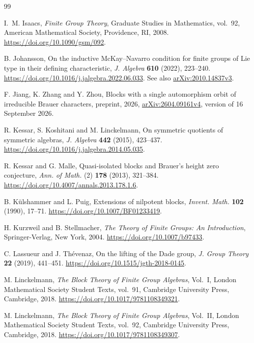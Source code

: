 \documentclass[11pt,a4paper]{article}
\theoremstyle{definition}
\theoremstyle{remark}
\numberwithin{equation}{section}
\begin{document}
\begin{thebibliography}{99}
		
		 I.~M. Isaacs, \textit{Finite Group Theory}, Graduate Studies in Mathematics, vol.~92, American Mathematical Society, Providence, RI, 2008. \url{https://doi.org/10.1090/gsm/092}.
		
		 B. Johansson, On the inductive McKay--Navarro condition for finite groups of Lie type in their defining characteristic, \textit{J. Algebra} \textbf{610} (2022), 223--240. \url{https://doi.org/10.1016/j.jalgebra.2022.06.033}. See also \href{https://arxiv.org/abs/2010.14837v3}{arXiv:2010.14837v3}.
		
		 F. Jiang, K. Zhang and Y. Zhou, Blocks with a single automorphism orbit of irreducible Brauer characters, preprint, 2026, \href{https://arxiv.org/abs/2604.09161v4}{arXiv:2604.09161v4}, version of 16 September 2026.
		
		 R. Kessar, S. Koshitani and M. Linckelmann, On symmetric quotients of symmetric algebras, \textit{J. Algebra} \textbf{442} (2015), 423--437. \url{https://doi.org/10.1016/j.jalgebra.2014.05.035}.
		
		 R. Kessar and G. Malle, Quasi-isolated blocks and Brauer's height zero conjecture, \textit{Ann. of Math.} (2) \textbf{178} (2013), 321--384. \url{https://doi.org/10.4007/annals.2013.178.1.6}.
		
		 B. K\"ulshammer and L. Puig, Extensions of nilpotent blocks, \textit{Invent. Math.} \textbf{102} (1990), 17--71. \url{https://doi.org/10.1007/BF01233419}.
		
		 H. Kurzweil and B. Stellmacher, \textit{The Theory of Finite Groups: An Introduction}, Springer-Verlag, New York, 2004. \url{https://doi.org/10.1007/b97433}.
		
		 C. Lassueur and J. Th\'evenaz, On the lifting of the Dade group, \textit{J. Group Theory} \textbf{22} (2019), 441--451. \url{https://doi.org/10.1515/jgth-2018-0145}.
		
		 M. Linckelmann, \textit{The Block Theory of Finite Group Algebras}, Vol.~I, London Mathematical Society Student Texts, vol.~91, Cambridge University Press, Cambridge, 2018. \url{https://doi.org/10.1017/9781108349321}.
		
		 M. Linckelmann, \textit{The Block Theory of Finite Group Algebras}, Vol.~II, London Mathematical Society Student Texts, vol.~92, Cambridge University Press, Cambridge, 2018. \url{https://doi.org/10.1017/9781108349307}.
		

\end{thebibliography}
\end{document}
